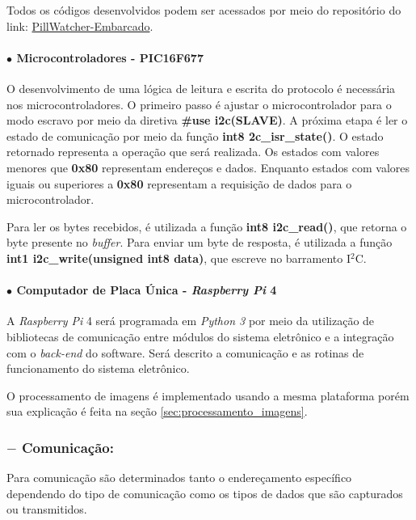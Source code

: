 Todos os códigos desenvolvidos podem ser acessados por meio do repositório do link: \href{https://github.com/PillWatcher/pillwatcher-embarcado}{PillWatcher-Embarcado}.

\paragraph*{$\bullet$ \textbf{Microcontroladores - PIC16F677}}

O desenvolvimento de uma lógica de leitura e escrita do protocolo é necessária nos microcontroladores. O primeiro passo é ajustar o microcontrolador para o modo escravo por meio da diretiva \textbf{\#use i2c(SLAVE)}. A próxima etapa é ler o estado de comunicação por meio da função \textbf{int8 2c\_isr\_state()}. O estado retornado representa a operação que será realizada. Os estados com valores menores que \textbf{0x80} representam endereços e dados. Enquanto estados com valores iguais ou superiores a \textbf{0x80} representam a requisição de dados para o microcontrolador.

Para ler os bytes recebidos, é utilizada a função \textbf{int8 i2c\_read()}, que retorna o byte presente no \textit{buffer}. Para enviar um byte de resposta, é utilizada a função \textbf{int1 i2c\_write(unsigned int8 data)}, que escreve no barramento I$^2$C.

\paragraph*{$\bullet$ \textbf{Computador de Placa Única - \textit{Raspberry Pi} 4}}

A \textit{Raspberry Pi} 4 será programada em \textit{Python 3} por meio da utilização de bibliotecas de comunicação entre módulos do sistema eletrônico e a integração com o \textit{back-end} do software. Será descrito a comunicação e as rotinas de funcionamento do sistema eletrônico.

O processamento de imagens é implementado usando a mesma plataforma porém sua explicação é feita na seção \ref{sec:processamento_imagens}.

\subsubsection*{$-$ \textbf{Comunicação:}}

Para comunicação são determinados tanto o endereçamento específico dependendo do tipo de comunicação como os tipos de dados que são capturados ou transmitidos.


